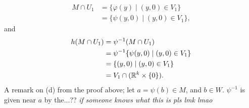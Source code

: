 \begin{align*}
    M \cap U_1 &= \{\varphi(y) \mid (y, 0) \in V_1 \} \\ 
    &= \{\psi(y, 0) \mid (y, 0) \in V_1 \},
\end{align*}
and
\begin{align*}
    h(M \cap U_1) &= \psi^{-1} (M \cap U_1) \\
    &= \psi^{-1} \{ \psi(y, 0) \mid (y, 0) \in V_1 \} \\
    &= \{ (y, 0) \mid (y, 0) \in V_1 \} \\
    &= V_1 \cap (\mathbb R^k \times \{0\}).
\end{align*}
A remark on (d) from the proof above; let $a = \psi(b) \in M$, and $b \in W$. $\psi^{-1}$ is given near $a$ by the...?? \textit{if someone knows what this is pls lmk lmao}